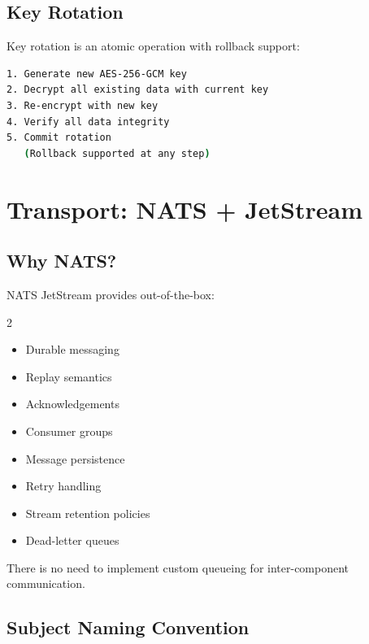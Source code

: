 \documentclass[12pt,a4paper]{article}
\begin{document}
\subsection{Key Rotation}

Key rotation is an atomic operation with rollback support:

\begin{lstlisting}[language=bash, caption={Key rotation process}]
1. Generate new AES-256-GCM key
2. Decrypt all existing data with current key
3. Re-encrypt with new key
4. Verify all data integrity
5. Commit rotation
   (Rollback supported at any step)
\end{lstlisting}

\section{Transport: NATS + JetStream}

\subsection{Why NATS?}

NATS JetStream provides out-of-the-box:

\begin{multicols}{2}
\begin{itemize}[noitemsep,leftmargin=*]
    \item Durable messaging
    \item Replay semantics
    \item Acknowledgements
    \item Consumer groups
    \item Message persistence
    \item Retry handling
    \item Stream retention policies
    \item Dead-letter queues
\end{itemize}
\end{multicols}

There is no need to implement custom queueing for inter-component communication.

\subsection{Subject Naming Convention}
\end{document}
